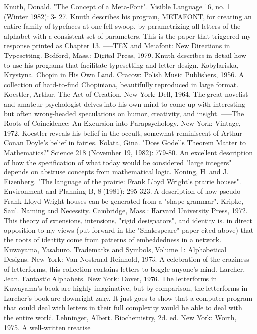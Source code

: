 Knuth, Donald. "The Concept of a Meta-Font". Visible Language 16, no. 1 (Winter 1982): 3-
  27. Knuth describes his program, METAFONT, for creating an entire family of typefaces at
  one fell swoop, by parametrizing all letters of the alphabet with a consistent set of
  parameters. This is the paper that triggered my response printed as Chapter 13.
-----TEX and Metafont: New Directions in Typesetting. Bedford, Mass.: Digital Press, 1979.
  Knuth describes in detail how to use his programs that facilitate typesetting and letter
  design.
Kobylariska, Krystyna. Chopin in His Own Land. Cracow: Polish Music Publishers, 1956. A
  collection of hard-to-find Chopiniana, beautifully reproduced in large format.
Koestler, Arthur. The Act of Creation. New York: Dell, 1964. The great novelist and amateur
  psychologist delves into his own mind to come up with interesting but often wrong-headed
  speculations on humor, creativity, and insight.
-----The Roots of Coincidence: An Excursion into Parapsychology. New York: Vintage,
  1972. Koestler reveals his belief in the occult, somewhat reminiscent of Arthur Conan
  Doyle's belief in fairies.
Kolata, Gina. "Does Godel's Theorem Matter to Mathematics?" Science 218 (November 19,
  1982): 779-80. An excellent description of how the specification of what today would be
  considered "large integers" depends on abstruse concepts from mathematical logic.
Koning, H. and J. Eizenberg. "The language of the prairie: Frank Lloyd Wright's prairie
  houses". Environment and Planning B, 8 (1981): 295-323. A description of how pseudo-
  Frank-Lloyd-Wright houses can be generated from a "shape grammar". Kripke, Saul.
  Naming and Necessity. Cambridge, Mass.: Harvard University Press, 1972. This theory of
  extensions, intensions, "rigid designators", and identity is. in direct opposition to my views
  (put forward in the "Shakespeare" paper cited above) that the roots of identity come from
  patterns of embeddedness in a network.
Kuwayama, Yasaburo. Trademarks and Symbols, Volume 1: Alphabetical Designs. New
  York: Van Nostrand Reinhold, 1973. A celebration of the craziness of letterforms, this
  collection contains letters to boggle anyone's mind.
Larcher, Jean. Fantastic Alphabets. New York: Dover, 1976. The letterforms in Kuwayama's
  book are highly imaginative, but by comparison, the letterforms in Larcher's book are
  downright zany. It just goes to show that a computer program that could deal with letters in
  their full complexity would be able to deal with the entire world.
Lehninger, Albert. Biochemistry, 2d. ed. New York: Worth, 1975. A well-written treatise
